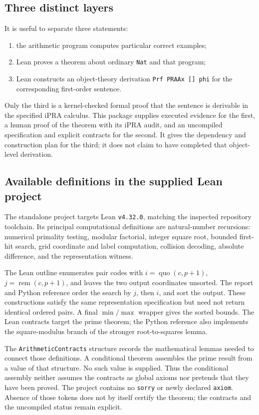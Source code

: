 \documentclass[11pt,letterpaper]{article}
\theoremstyle{definition}
\theoremstyle{remark}
\newcommand{\remd}{\operatorname{rem}}
\newcommand{\quod}{\operatorname{quo}}
\begin{document}
\subsection{Three distinct layers}

It is useful to separate three statements:
\begin{enumerate}
\item the arithmetic program computes particular correct examples;
\item Lean proves a theorem about ordinary \texttt{Nat} and that program;
\item Lean constructs an object-theory derivation
      \texttt{Prf PRAAx [] phi} for the corresponding first-order sentence.
\end{enumerate}
Only the third is a kernel-checked formal proof that the sentence is
derivable in the specified iPRA calculus. This package supplies executed
evidence for the first, a human proof of the theorem with its iPRA audit,
and an uncompiled specification and explicit contracts for the second.
It gives the dependency and construction plan for the third; it does not
claim to have completed that object-level derivation.

\subsection{Available definitions in the supplied Lean project}

The standalone project targets Lean \texttt{v4.32.0}, matching the
inspected repository toolchain. Its principal computational definitions
are natural-number recursions: numerical primality testing, modular
factorial, integer square root, bounded first-hit search, grid coordinate
and label computation, collision decoding, absolute difference, and the
representation witness.

The Lean outline enumerates pair codes with
\(i=\quod(c,p+1)\), \(j=\remd(c,p+1)\), and leaves the two output
coordinates unsorted. The report and Python reference order the search
by \(j\), then \(i\), and sort the output. These constructions satisfy
the same representation specification but need not return identical
ordered pairs. A final \(\min/\max\) wrapper gives the sorted bounds.
The Lean contracts target the prime theorem; the Python reference also
implements the square-modulus branch of the stronger root-to-squares lemma.

The \texttt{ArithmeticContracts} structure records the mathematical lemmas
needed to connect those definitions. A conditional theorem assembles the
prime result from a value of that structure. No such value is supplied.
Thus the conditional assembly neither assumes the contracts as global
axioms nor pretends that they have been proved. The project contains no
\texttt{sorry} or newly declared \texttt{axiom}. Absence of those tokens
does not by itself certify the theorem; the contracts and the uncompiled
status remain explicit.
\end{document}

